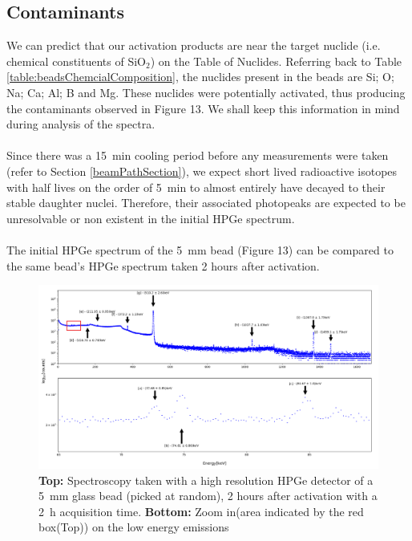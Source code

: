 \documentclass[]{article}
\begin{document}
\subsection{Contaminants}
We can predict that our activation products are near the target nuclide (i.e. chemical constituents of SiO$_2$) on the Table of Nuclides. Referring back to Table \ref{table:beadsChemcialComposition}, the nuclides present in the beads are Si; O; Na; Ca; Al; B and Mg. These nuclides were potentially activated, thus producing the contaminants observed in Figure 13. We shall keep this information in mind during analysis of the spectra.\\\\
Since there was a \SI{15}{\minute} cooling period before any measurements were taken (refer to Section \ref{beamPathSection}), we expect short lived radioactive isotopes with half lives on the order of \SI{5}{\minute} to almost entirely have decayed to their stable daughter nuclei. Therefore, their associated photopeaks are expected to be unresolvable or non existent in the initial HPGe spectrum.\\\\
The initial HPGe spectrum of the \SI{5}{\milli \metre} bead (Figure 13) can be compared to the same bead's HPGe spectrum taken 2 hours after activation.
\begin{figure}[h!]
	\includegraphics[scale = 0.42]{HPGe_2H.png}
	\centering
	\captionsetup{justification=centering,margin=1cm}
	\caption{\textbf{Top:} Spectroscopy taken with a high resolution HPGe detector of a \SI{5}{\milli \metre} glass bead (picked at random), 2 hours after activation with a \SI{2}{\hour} acquisition time. \textbf{Bottom:} Zoom in(area indicated by the red box(Top)) on the low energy emissions}
	\label{fig:HPGe_2H}
\end{figure}~\\
\end{document}

